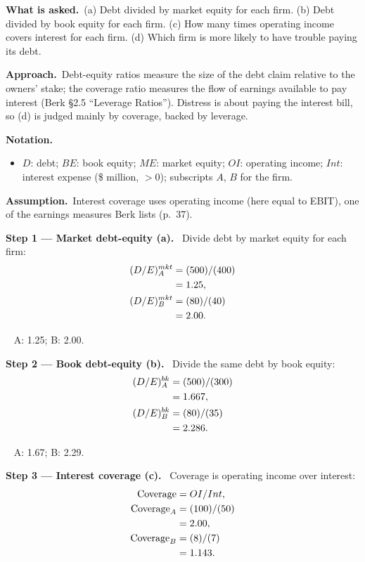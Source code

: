\documentclass[11pt,a4paper]{article}
\newcommand{\notation}{\par\noindent\textbf{Notation.}}
\newcommand{\step}[2]{\par\medskip\noindent\textbf{Step #1 --- #2.}~}
\newcommand{\assume}{\par\smallskip\noindent\textbf{Assumption.}~}
\newcommand{\asked}{\par\medskip\noindent\textbf{What is asked.}~}
\newcommand{\approach}{\par\smallskip\noindent\textbf{Approach.}~}
\newcommand{\answer}[1]{\par\smallskip\noindent\fbox{\textbf{Answer #1.}}~}
\begin{document}
\asked (a) Debt divided by market equity for each firm. (b) Debt divided by book equity for each
firm. (c) How many times operating income covers interest for each firm. (d) Which firm is more
likely to have trouble paying its debt.

\approach Debt-equity ratios measure the size of the debt claim relative to the owners' stake; the
coverage ratio measures the flow of earnings available to pay interest (Berk \S2.5 ``Leverage
Ratios''). Distress is about paying the interest bill, so (d) is judged mainly by coverage, backed
by leverage.

\notation
\begin{itemize}
  \item $D$: debt; $BE$: book equity; $ME$: market equity; $OI$: operating income; $Int$: interest
        expense (\$ million, $> 0$); subscripts $A$, $B$ for the firm.
\end{itemize}
\assume Interest coverage uses operating income (here equal to EBIT), one of the earnings measures
Berk lists (p.~37).

\step{1}{Market debt-equity (a)}
Divide debt by market equity for each firm:
\begin{align}
  (D/E)^{mkt}_A &= (500)/(400) \notag\\
  &= 1.25, \notag\\
  (D/E)^{mkt}_B &= (80)/(40) \notag\\
  &= 2.00. \notag
\end{align}

\answer{(a)} A: 1.25; B: 2.00.

\step{2}{Book debt-equity (b)}
Divide the same debt by book equity:
\begin{align}
  (D/E)^{bk}_A &= (500)/(300) \notag\\
  &= 1.667, \notag\\
  (D/E)^{bk}_B &= (80)/(35) \notag\\
  &= 2.286. \notag
\end{align}

\answer{(b)} A: 1.67; B: 2.29.

\step{3}{Interest coverage (c)}
Coverage is operating income over interest:
\begin{align}
  \text{Coverage} &= OI/Int, \label{e6-cov}\\
  \text{Coverage}_A &= (100)/(50) \notag\\
  &= 2.00, \notag\\
  \text{Coverage}_B &= (8)/(7) \notag\\
  &= 1.143. \notag
\end{align}
\end{document}
